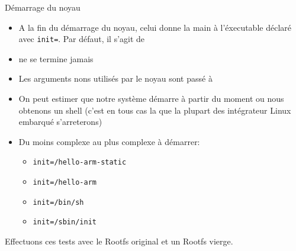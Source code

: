 \begin{frame}[fragile=singleslide]{Démarrage du noyau}
  \begin{itemize}
  \item  A  la fin  du  démarrage  du noyau,  celui  donne  la main  à
    l'éxecutable déclaré  avec \verb+init=+. Par défaut,  il s'agit de
  \item {} ne se termine jamais
  \item  Les  arguments  nons  utilisés  par le  noyau  sont  passé  à
  \item On peut  estimer que notre système démarre  à partir du moment
    ou nous  obtenons un shell (c'est  en tous cas  la que la
      plupart des intégrateur Linux embarqué s'arreterons)
  \item Du moins complexe au plus complexe à démarrer:
  \begin{itemize}
    \item \verb+init=/hello-arm-static+
    \item \verb+init=/hello-arm+
    \item \verb+init=/bin/sh+
    \item \verb+init=/sbin/init+
    \end{itemize}
  \end{itemize}
  Effectuons ces tests avec le Rootfs original et un Rootfs vierge.
\end{frame}


